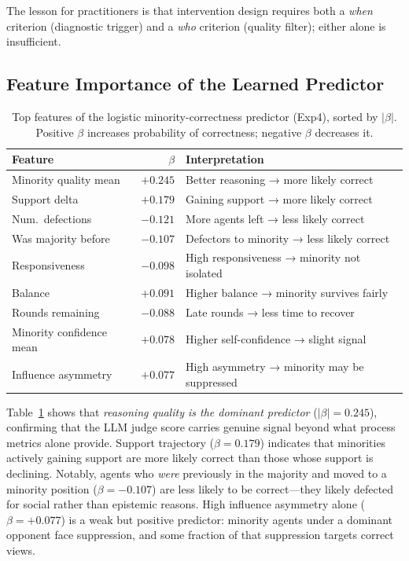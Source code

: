 The lesson for practitioners is that intervention design requires both a
\emph{when} criterion (diagnostic trigger) and a \emph{who} criterion
(quality filter); either alone is insufficient.

\subsection{Feature Importance of the Learned Predictor}
\label{sec:feature_importance}

\begin{table}[t]
\centering
\caption{Top features of the logistic minority-correctness predictor
(Exp4), sorted by $|\beta|$.
Positive $\beta$ increases probability of correctness; negative $\beta$
decreases it.}
\label{tab:features}
\small
\begin{tabular}{lrl}
\toprule
\textbf{Feature} & $\beta$ & \textbf{Interpretation} \\
\midrule
Minority quality mean     & $+0.245$ & Better reasoning → more likely correct \\
Support delta             & $+0.179$ & Gaining support → more likely correct \\
Num.\ defections          & $-0.121$ & More agents left → less likely correct \\
Was majority before       & $-0.107$ & Defectors to minority → less likely correct \\
Responsiveness            & $-0.098$ & High responsiveness → minority not isolated \\
Balance                   & $+0.091$ & Higher balance → minority survives fairly \\
Rounds remaining          & $-0.088$ & Late rounds → less time to recover \\
Minority confidence mean  & $+0.078$ & Higher self-confidence → slight signal \\
Influence asymmetry       & $+0.077$ & High asymmetry → minority may be suppressed \\
\bottomrule
\end{tabular}
\end{table}

Table~\ref{tab:features} shows that \emph{reasoning quality is the dominant
predictor} ($|\beta|=0.245$), confirming that the LLM judge score carries
genuine signal beyond what process metrics alone provide.
Support trajectory ($\beta=0.179$) indicates that minorities actively gaining
support are more likely correct than those whose support is declining.
Notably, agents who \emph{were} previously in the majority and moved to a
minority position ($\beta=-0.107$) are less likely to be correct—they
likely defected for social rather than epistemic reasons.
High influence asymmetry alone ($\beta=+0.077$) is a weak but positive
predictor: minority agents under a dominant opponent face suppression, and
some fraction of that suppression targets correct views.

